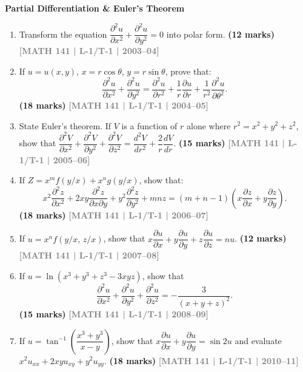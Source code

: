 \documentclass[12pt,a4paper]{article}
\newcommand{\yr}[1]{\hfill\textcolor{gray}{\small\textbf{[#1]}}}
\newcommand{\mk}[1]{\textcolor{orange!70!black}{\small\textbf{(#1 marks)}}}
\newcommand{\subtopic}[2]{%
  \vspace{10pt}
  \noindent\begin{tcolorbox}[colback=#1!8,colframe=#1,boxrule=0.6pt,arc=4pt,
    left=6pt,right=6pt,top=4pt,bottom=4pt]
    \small\bfseries\textcolor{#1}{#2}
  \end{tcolorbox}
  \vspace{2pt}
}
\begin{document}
\subtopic{cA}{Partial Differentiation \& Euler's Theorem}
\label{sub:s1-partial}

\begin{enumerate}

\item Transform the equation $\dfrac{\partial^{2}u}{\partial x^{2}}+\dfrac{\partial^{2}u}{\partial y^{2}}=0$ into polar form.
\mk{12} \yr{MATH 141 | L-1/T-1 | 2003--04}

\item If $u=u(x,y)$, $x=r\cos\theta$, $y=r\sin\theta$, prove that:
\[
\frac{\partial^{2}u}{\partial x^{2}}+\frac{\partial^{2}u}{\partial y^{2}}=\frac{\partial^{2}u}{\partial r^{2}}+\frac{1}{r}\frac{\partial u}{\partial r}+\frac{1}{r^{2}}\frac{\partial^{2}u}{\partial\theta^{2}}.
\]
\mk{18} \yr{MATH 141 | L-1/T-1 | 2004--05}

\item State Euler's theorem. If $V$ is a function of $r$ alone where $r^{2}=x^{2}+y^{2}+z^{2}$, show that $\dfrac{\partial^{2}V}{\partial x^{2}}+\dfrac{\partial^{2}V}{\partial y^{2}}+\dfrac{\partial^{2}V}{\partial z^{2}}=\dfrac{d^{2}V}{dr^{2}}+\dfrac{2}{r}\dfrac{dV}{dr}$.
\mk{15} \yr{MATH 141 | L-1/T-1 | 2005--06}

\item If $Z=x^{m}f(y/x)+x^{n}g(y/x)$, show that:
\[
x^{2}\frac{\partial^{2}z}{\partial x^{2}}+2xy\frac{\partial^{2}z}{\partial x\partial y}+y^{2}\frac{\partial^{2}z}{\partial y^{2}}+mnz=(m+n-1)\!\left(x\frac{\partial z}{\partial x}+y\frac{\partial z}{\partial y}\right).
\]
\mk{18} \yr{MATH 141 | L-1/T-1 | 2006--07}

\item If $u=x^{n}f(y/x,\,z/x)$, show that $x\dfrac{\partial u}{\partial x}+y\dfrac{\partial u}{\partial y}+z\dfrac{\partial u}{\partial z}=nu$.
\mk{12} \yr{MATH 141 | L-1/T-1 | 2007--08}

\item If $u=\ln(x^{3}+y^{3}+z^{3}-3xyz)$, show that
\[
\frac{\partial^{2}u}{\partial x^{2}}+\frac{\partial^{2}u}{\partial y^{2}}+\frac{\partial^{2}u}{\partial z^{2}}=-\frac{3}{(x+y+z)^{2}}.
\]
\mk{15} \yr{MATH 141 | L-1/T-1 | 2008--09}

\item If $u=\tan^{-1}\!\left(\dfrac{x^{3}+y^{3}}{x-y}\right)$, show that $x\dfrac{\partial u}{\partial x}+y\dfrac{\partial u}{\partial y}=\sin 2u$ and evaluate $x^{2}u_{xx}+2xyu_{xy}+y^{2}u_{yy}$.
\mk{18} \yr{MATH 141 | L-1/T-1 | 2010--11}


\end{enumerate}
\end{document}
